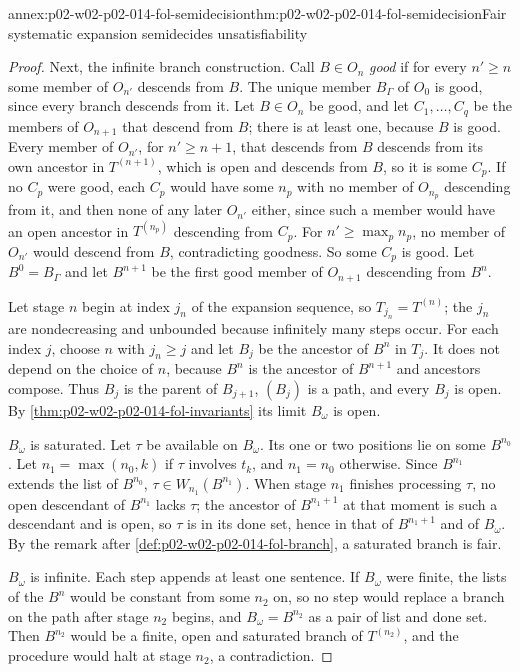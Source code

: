 \begin{annexitem}{annex:p02-w02-p02-014-fol-semidecision}{thm:p02-w02-p02-014-fol-semidecision}{Fair systematic expansion semidecides unsatisfiability}
\begin{proof}
Next, the infinite branch construction.  Call \(B\in O_n\) \emph{good} if
for every \(n'\geq n\) some member of \(O_{n'}\) descends from \(B\).  The
unique member \(B_\Gamma\) of \(O_0\) is good, since every branch descends
from it.  Let \(B\in O_n\) be good, and let \(C_1,\ldots,C_q\) be the members
of \(O_{n+1}\) that descend from \(B\); there is at least one, because \(B\)
is good.  Every member of \(O_{n'}\), for \(n'\geq n+1\), that descends from
\(B\) descends from its own ancestor in \(T^{(n+1)}\), which is open and
descends from \(B\), so it is some \(C_p\).  If no \(C_p\) were good, each
\(C_p\) would have some \(n_p\) with no member of \(O_{n_p}\) descending from
it, and then none of any later \(O_{n'}\) either, since such a member would
have an open ancestor in \(T^{(n_p)}\) descending from \(C_p\).  For
\(n'\geq\max_p n_p\), no member of \(O_{n'}\) would descend from \(B\),
contradicting goodness.  So some \(C_p\) is good.  Let \(B^{0}=B_\Gamma\) and
let \(B^{n+1}\) be the first good member of \(O_{n+1}\) descending from
\(B^{n}\).

Let stage \(n\) begin at index \(j_n\) of the expansion sequence, so
\(T_{j_n}=T^{(n)}\); the \(j_n\) are nondecreasing and unbounded because
infinitely many steps occur.  For each index \(j\), choose \(n\) with
\(j_n\geq j\) and let \(B_j\) be the ancestor of \(B^{n}\) in \(T_j\).  It
does not depend on the choice of \(n\), because \(B^{n}\) is the ancestor of
\(B^{n+1}\) and ancestors compose.  Thus \(B_j\) is the parent of
\(B_{j+1}\), \((B_j)\) is a path, and every \(B_j\) is open.  By
\cref{thm:p02-w02-p02-014-fol-invariants} its limit \(B_\omega\) is open.

\(B_\omega\) is saturated.  Let \(\tau\) be available on \(B_\omega\).  Its
one or two positions lie on some \(B^{n_0}\).  Let \(n_1=\max(n_0,k)\) if
\(\tau\) involves \(t_k\), and \(n_1=n_0\) otherwise.  Since \(B^{n_1}\)
extends the list of \(B^{n_0}\), \(\tau\in W_{n_1}(B^{n_1})\).  When stage
\(n_1\) finishes processing \(\tau\), no open descendant of \(B^{n_1}\) lacks
\(\tau\); the ancestor of \(B^{n_1+1}\) at that moment is such a descendant
and is open, so \(\tau\) is in its done set, hence in that of
\(B^{n_1+1}\) and of \(B_\omega\).  By the remark after
\cref{def:p02-w02-p02-014-fol-branch}, a saturated branch is fair.

\(B_\omega\) is infinite.  Each step appends at least one sentence.  If
\(B_\omega\) were finite, the lists of the \(B^{n}\) would be constant from
some \(n_2\) on, so no step would replace a branch on the path after stage
\(n_2\) begins, and \(B_\omega=B^{n_2}\) as a pair of list and done set.  Then
\(B^{n_2}\) would be a finite, open and saturated branch of \(T^{(n_2)}\), and
the procedure would halt at stage \(n_2\), a contradiction.


\end{proof}
\end{annexitem}
